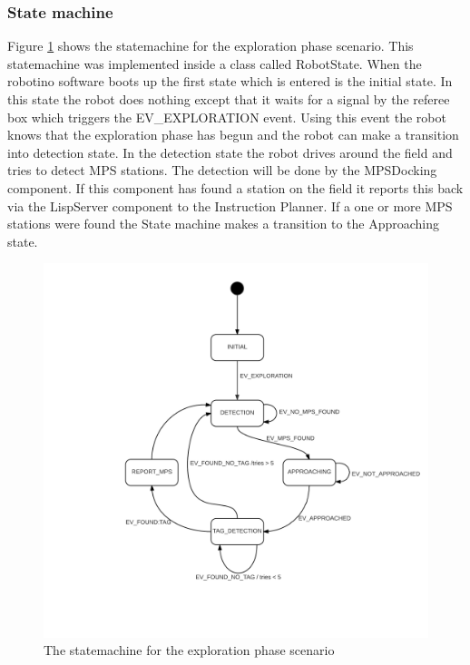 \subsubsection{State machine}


Figure \ref{fig:statemachine} shows the statemachine for the exploration phase scenario. This statemachine was implemented inside a class called RobotState. When the robotino software boots up the first state which is entered is the initial state. In this state the robot does nothing except that it waits for a signal by the referee box which triggers the EV\_EXPLORATION event. Using this event the robot knows that the exploration phase has begun and the robot can make a transition into detection state. In the detection state the robot drives around the field and tries to detect MPS stations. The detection will be done by the MPSDocking component. If this component has found a station on the field it reports this back via the LispServer component to the Instruction Planner. If a one or more MPS stations were found the State machine makes a transition to the Approaching state. \\


\begin{figure}
\centering
\includegraphics[scale=0.25]{pic/robotino_state_machine.png}
\caption{The statemachine for the exploration phase scenario}
\label{fig:statemachine}
\end{figure}

